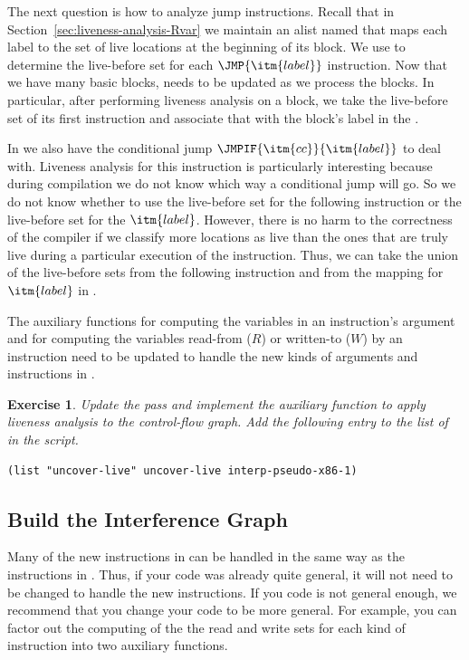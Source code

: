 \documentclass[11pt]{book}
\newtheorem{exercise}[theorem]{Exercise}
\begin{document}
The next question is how to analyze jump instructions.  Recall that in
Section~\ref{sec:liveness-analysis-Rvar} we maintain an alist named
 that maps each label to the set of live locations
at the beginning of its block. We use  to determine
the live-before set for each $\JMP{\itm{label}}$ instruction.  Now
that we have many basic blocks,  needs to be updated
as we process the blocks. In particular, after performing liveness
analysis on a block, we take the live-before set of its first
instruction and associate that with the block's label in the
.

In \LangXIfVar{} we also have the conditional jump
$\JMPIF{\itm{cc}}{\itm{label}}$ to deal with.  Liveness analysis for
this instruction is particularly interesting because during
compilation we do not know which way a conditional jump will go.  So
we do not know whether to use the live-before set for the following
instruction or the live-before set for the $\itm{label}$.  However,
there is no harm to the correctness of the compiler if we classify
more locations as live than the ones that are truly live during a
particular execution of the instruction. Thus, we can take the union
of the live-before sets from the following instruction and from the
mapping for $\itm{label}$ in .

The auxiliary functions for computing the variables in an
instruction's argument and for computing the variables read-from ($R$)
or written-to ($W$) by an instruction need to be updated to handle the
new kinds of arguments and instructions in \LangXIfVar{}.

\begin{exercise}\normalfont
Update the  pass and implement the
 auxiliary function to apply liveness analysis
to the control-flow graph.  Add the following entry to the list of
 in the  script.
\begin{lstlisting}
(list "uncover-live" uncover-live interp-pseudo-x86-1)
\end{lstlisting}
\end{exercise}

\subsection{Build the Interference Graph}
\label{sec:build-interference-Rif}

Many of the new instructions in \LangXIfVar{} can be handled in the
same way as the instructions in \LangXVar{}. Thus, if your code was
already quite general, it will not need to be changed to handle the
new instructions. If you code is not general enough, we recommend that
you change your code to be more general. For example, you can factor
out the computing of the the read and write sets for each kind of
instruction into two auxiliary functions.
\end{document}
